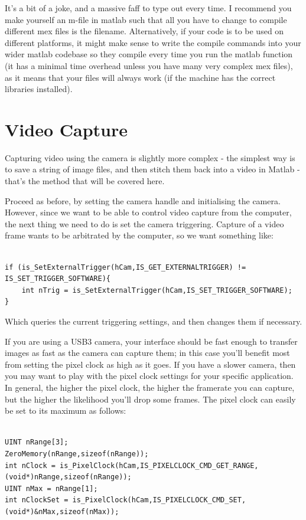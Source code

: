 \documentclass[12pt,a4paper]{article}
\begin{document}
It's a bit of a joke, and a massive faff to type out every time. I recommend you make yourself an m-file in matlab such that all you have to change to compile different mex files is the filename. Alternatively, if your code is to be used on different platforms, it might make sense to write the compile commands into your wider matlab codebase so they compile every time you run the matlab function (it has a minimal time overhead unless you have many very complex mex files), as it means that your files will always work (if the machine has the correct libraries installed).


\section{Video Capture}


Capturing video using the camera is slightly more complex - the simplest way is to save a string of image files, and then stitch them back into a video in Matlab - that's the method that will be covered here.

Proceed as before, by setting the camera handle and initialising the camera. However, since we want to be able to control video capture from the computer, the next thing we need to do is set the camera triggering. Capture of a video frame wants to be arbitrated by the computer, so we want something like:

\lstset{language=C++}
\begin{lstlisting}

if (is_SetExternalTrigger(hCam,IS_GET_EXTERNALTRIGGER) != IS_SET_TRIGGER_SOFTWARE){
	int nTrig = is_SetExternalTrigger(hCam,IS_SET_TRIGGER_SOFTWARE);
}

\end{lstlisting}

Which queries the current triggering settings, and then changes them if necessary.

If you are using a USB3 camera, your interface should be fast enough to transfer images as fast as the camera can capture them; in this case you'll benefit most from setting the pixel clock as high as it goes. If you have a slower camera, then you may want to play with the pixel clock settings for your specific application. In general, the higher the pixel clock, the higher the framerate you can capture, but the higher the likelihood you'll drop some frames. The pixel clock can easily be set to its maximum as follows:



\lstset{language=C++}
\begin{lstlisting}

UINT nRange[3];
ZeroMemory(nRange,sizeof(nRange));
int nClock = is_PixelClock(hCam,IS_PIXELCLOCK_CMD_GET_RANGE,(void*)nRange,sizeof(nRange));
UINT nMax = nRange[1];
int nClockSet = is_PixelClock(hCam,IS_PIXELCLOCK_CMD_SET,(void*)&nMax,sizeof(nMax));

\end{lstlisting}
\end{document}
